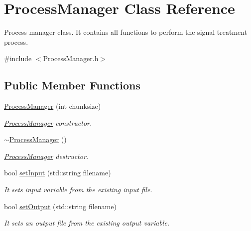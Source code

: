 \hypertarget{class_process_manager}{}\section{Process\+Manager Class Reference}
\label{class_process_manager}


Process manager class. It contains all functions to perform the signal treatment process.  




{\ttfamily \#include $<$Process\+Manager.\+h$>$}

\subsection*{Public Member Functions}
\begin{DoxyCompactItemize}
\item 
\hyperlink{class_process_manager_a875b49ae7a67b7629615747320ff30b7}{Process\+Manager} (int chunksize)
\begin{DoxyCompactList}\small\item\em \hyperlink{class_process_manager}{Process\+Manager} constructor. \end{DoxyCompactList}\item 
\mbox{\label{class_process_manager_aed3cd2ca11d92395228b758d39030b5f}} 
\hyperlink{class_process_manager_aed3cd2ca11d92395228b758d39030b5f}{$\sim$\+Process\+Manager} ()
\begin{DoxyCompactList}\small\item\em \hyperlink{class_process_manager}{Process\+Manager} destructor. \end{DoxyCompactList}\item 
bool \hyperlink{class_process_manager_a830d46989b28e8c4b37f4bcf94dc76a4}{set\+Input} (std\+::string filename)
\begin{DoxyCompactList}\small\item\em It sets input variable from the existing input file. \end{DoxyCompactList}\item 
bool \hyperlink{class_process_manager_aa2deb4f60f83a490ed7520d2ce926626}{set\+Output} (std\+::string filename)
\begin{DoxyCompactList}\small\item\em It sets an output file from the existing output variable. \end{DoxyCompactList}\item 

\end{DoxyCompactItemize}
